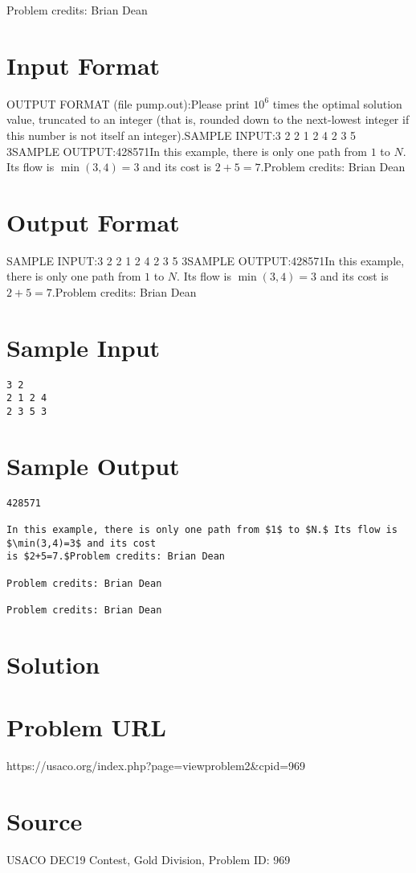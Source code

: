 \documentclass[12pt]{article}
\begin{document}
Problem credits: Brian Dean



\section*{Input Format}
OUTPUT FORMAT (file pump.out):Please print $10^6$ times the optimal solution value, truncated to an integer
(that is, rounded down to the next-lowest integer if this number is not itself
an integer).SAMPLE INPUT:3 2
2 1 2 4
2 3 5 3SAMPLE OUTPUT:428571In this example, there is only one path from $1$ to $N.$ Its flow is $\min(3,4)=3$ and its cost
is $2+5=7.$Problem credits: Brian Dean

\section*{Output Format}
SAMPLE INPUT:3 2
2 1 2 4
2 3 5 3SAMPLE OUTPUT:428571In this example, there is only one path from $1$ to $N.$ Its flow is $\min(3,4)=3$ and its cost
is $2+5=7.$Problem credits: Brian Dean

\section*{Sample Input}
\begin{verbatim}
3 2
2 1 2 4
2 3 5 3
\end{verbatim}

\section*{Sample Output}
\begin{verbatim}
428571

In this example, there is only one path from $1$ to $N.$ Its flow is $\min(3,4)=3$ and its cost
is $2+5=7.$Problem credits: Brian Dean

Problem credits: Brian Dean

Problem credits: Brian Dean
\end{verbatim}

\section*{Solution}


\section*{Problem URL}
https://usaco.org/index.php?page=viewproblem2&cpid=969

\section*{Source}
USACO DEC19 Contest, Gold Division, Problem ID: 969
\end{document}

